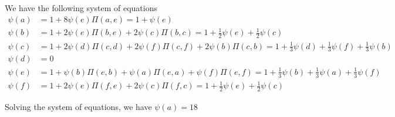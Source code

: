 \documentclass{article}
\begin{document}
We have the following system of equations
\begin{align*}
    \psi(a) &= 1 + 8 \psi(e) \Pi(a, e) = 1 + \psi(e) \\
    \psi(b) &= 1 + 2 \psi(e) \Pi(b, e) + 2 \psi(c) \Pi(b, c) = 1 + \frac{1}{2} \psi(e) + \frac{1}{2} \psi(c) \\
    \psi(c) &= 1 + 2 \psi(d) \Pi(c, d) + 2 \psi(f) \Pi(c, f) + 2 \psi(b) \Pi(c, b) = 1 + \frac{1}{3} \psi(d) + \frac{1}{3} \psi(f) + \frac{1}{3} \psi(b) \\
    \psi(d) &= 0 \\
    \psi(e) &= 1 + \psi(b) \Pi(e, b) + \psi(a) \Pi(e, a) + \psi(f) \Pi(e, f) = 1 + \frac{1}{3}\psi(b) + \frac{1}{3}\psi(a) + \frac{1}{3}\psi(f) \\
    \psi(f) &= 1 + 2 \psi(e) \Pi(f,e) + 2 \psi(c) \Pi(f, c) = 1 + \frac{1}{2}\psi(e) + \frac{1}{2}\psi(c)
\end{align*}

Solving the system of equations, we have $\psi(a) = 18$
\end{document}
